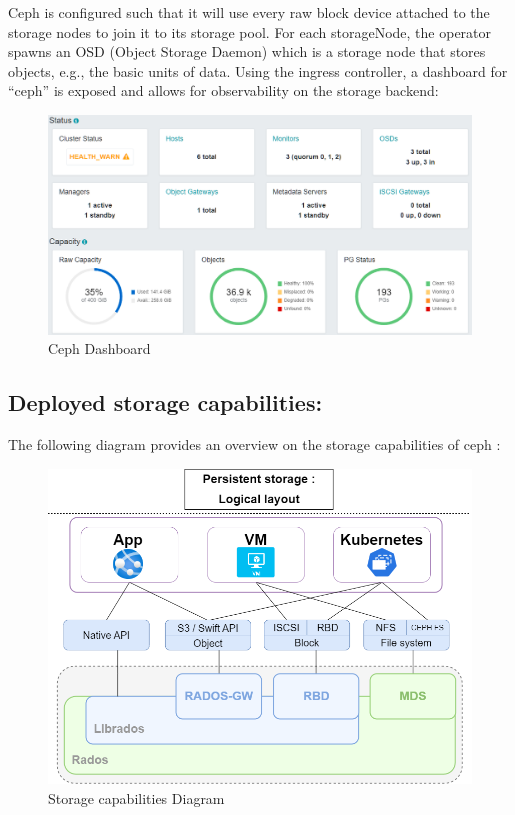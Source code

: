 Ceph is configured such that it will use every raw block device attached to the storage nodes to join it to its storage pool. For each storageNode, the operator spawns an OSD (Object Storage Daemon) which is a storage node that stores objects, e.g., the basic units of data.  
Using the ingress controller, a dashboard for “ceph” is exposed and allows for observability on the storage backend: 
\begin{figure}[H]\centering
\includegraphics[width=1.0\textwidth,angle=00]{assets/f29.png}
\caption{Ceph Dashboard }
\label{fig:Ceph Dashboard }
\end{figure}

\subsection{Deployed storage capabilities: }

The following diagram provides an overview on the storage capabilities of ceph : 
\begin{figure}[H]\centering
\includegraphics[width=1.0\textwidth,angle=00]{assets/f30.png}
\caption{Storage capabilities Diagram}
\label{fig:f30}
\end{figure}

